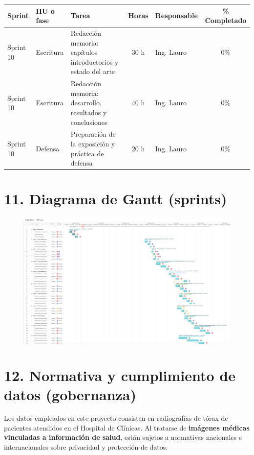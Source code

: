 \documentclass[
11pt, %
]{charter}
\begin{document}
\begin{table}[htpb]
\centering
\begin{tabularx}{\linewidth}{@{}|l|l|X|c|l|c|@{}}
\hline
\rowcolor[HTML]{C0C0C0}
Sprint & HU o fase & Tarea & Horas & Responsable & \% Completado \\ \hline
Sprint 10 & Escritura & Redacción memoria: capítulos introductorios y estado del arte & 30 h & Ing. Lauro & 0\% \\ \hline
Sprint 10 & Escritura & Redacción memoria: desarrollo, resultados y conclusiones & 40 h & Ing. Lauro & 0\% \\ \hline
Sprint 10 & Defensa & Preparación de la exposición y práctica de defensa & 20 h & Ing. Lauro & 0\% \\ \hline
\end{tabularx}
\end{table}





\section{11. Diagrama de Gantt (sprints)}

\begin{figure}[ht]
    \centering
    \includegraphics[angle=90,width=0.95\linewidth]{gantt.pdf}
    \label{fig:gantt}
\end{figure}





\section{12. Normativa y cumplimiento de datos (gobernanza)}


Los datos empleados en este proyecto consisten en radiografías de tórax de pacientes atendidos en el Hospital de Clínicas. Al tratarse de \textbf{imágenes médicas vinculadas a información de salud}, están sujetos a normativas nacionales e internacionales sobre privacidad y protección de datos.  
\end{document}
